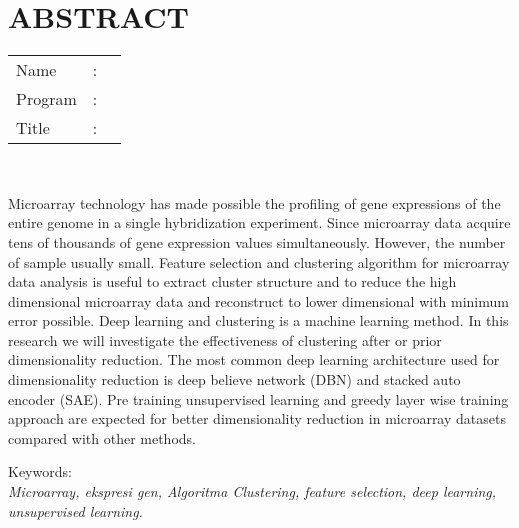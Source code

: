 %
%
%

\chapter*{ABSTRACT}

\vspace*{0.2cm}

\noindent \begin{tabular}{l l p{11.0cm}}
	Name&: & \penulis \\
	Program&: & \program \\
	Title&: & \judulInggris \\
\end{tabular} \\ 

\vspace*{0.5cm}

\noindent 
Microarray technology has made possible the profiling of gene expressions of the entire genome in a single hybridization experiment. Since microarray data acquire tens of thousands of gene expression values simultaneously. However, the number of sample usually small. Feature selection and clustering algorithm for microarray data analysis is useful to extract cluster structure and to reduce the high dimensional microarray data and reconstruct to lower dimensional with minimum error possible. Deep learning and clustering is a machine learning method. In this research we will investigate the effectiveness of clustering after or prior dimensionality reduction. The most common deep learning architecture used for dimensionality reduction is deep believe network (DBN) and stacked auto encoder (SAE). Pre training unsupervised learning and greedy layer wise training approach are expected for better dimensionality reduction in microarray datasets compared with other methods.

\vspace*{0.2cm}

\noindent Keywords: \\ 
\noindent \textit{Microarray, ekspresi gen, Algoritma Clustering, feature selection, deep learning, unsupervised learning.}

\newpage